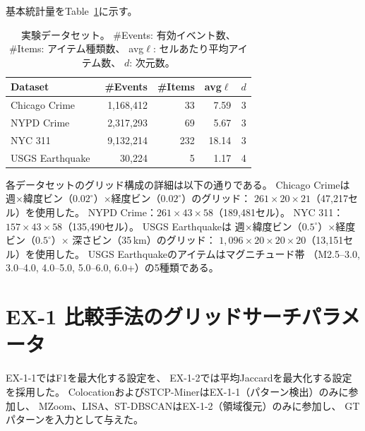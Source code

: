 基本統計量をTable~\ref{tab:datasets}に示す。

\begin{table}[h]
\centering
\caption{実験データセット。
\#Events: 有効イベント数、
\#Items: アイテム種類数、
avg$\ell$: セルあたり平均アイテム数、
$d$: 次元数。}
\label{tab:datasets}
\small
\begin{tabular}{lrrrr}
\toprule
Dataset & \#Events & \#Items & avg$\ell$ & $d$ \\
\midrule
Chicago Crime~\cite{chicagocrime}       & 1,168,412 &  33 & 7.59 & 3 \\
NYPD Crime~\cite{nypdcrime}             & 2,317,293 &  69 & 5.67 & 3 \\
NYC 311~\cite{nyc311}                   & 9,132,214 & 232 & 18.14 & 3 \\
USGS Earthquake~\cite{usgseq}          &    30,224 &   5 & 1.17 & 4 \\
\bottomrule
\end{tabular}
\end{table}

各データセットのグリッド構成の詳細は以下の通りである。
Chicago Crimeは
週$\times$緯度ビン（$0.02^\circ$）$\times$経度ビン（$0.02^\circ$）のグリッド：
$261 \times 20 \times 21$（47,217セル）を使用した。
NYPD Crime：$261 \times 43 \times 58$（189,481セル）。
NYC 311：$157 \times 43 \times 58$（135,490セル）。
USGS Earthquakeは
週$\times$緯度ビン（$0.5^\circ$）$\times$経度ビン（$0.5^\circ$）$\times$
深さビン（35\,km）のグリッド：
$1{,}096 \times 20 \times 20 \times 20$（13,151セル）を使用した。
USGS Earthquakeのアイテムはマグニチュード帯
（M2.5--3.0, 3.0--4.0, 4.0--5.0, 5.0--6.0, 6.0+）の5種類である。

\section{EX-1 比較手法のグリッドサーチパラメータ}
\label{sec:grid_search_params_r1}

EX-1-1ではF1を最大化する設定を、
EX-1-2では平均Jaccardを最大化する設定を採用した。
ColocationおよびSTCP-MinerはEX-1-1（パターン検出）のみに参加し、
MZoom、LISA、ST-DBSCANはEX-1-2（領域復元）のみに参加し、
GTパターンを入力として与えた。

